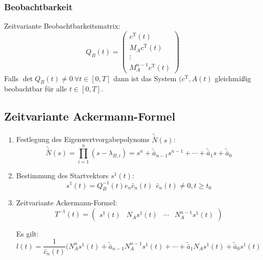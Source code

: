 \subsubsection{Beobachtbarkeit}
Zeitvariante Beobachtbarkeitsmatrix:
\begin{equation}
    Q_B(t) =
    \begin{pmatrix}
        c^\text{T}(t) \\ M_A c^\text{T}(t) \\ \vdots \\ M_A^{n-1} c^\text{T} (t)
    \end{pmatrix}
\end{equation}
Falls $\det Q_B(t) \neq 0\ \forall t \in [0, T]$ dann ist das System $(c^\text{T}, A(t)$
gleichmäßig beobachtbar für alle $t \in [0, T]$.

\subsection{Zeitvariante Ackermann-Formel}
\begin{enumerate}
    \item
        Festlegung des Eigenwertvorgabepolynoms $\tilde{\bar{N}}(s)$:
        \begin{equation}
            \tilde{\bar{N}}(s) = \prod_{i=1}^n (s-\lambda_{B,i})
                = s^n + \tilde{\bar{a}}_{n-1} s^{n-1} + \cdots + \tilde{\bar{a}}_1 s +
                    \tilde{\bar{a}}_0
        \end{equation}
    \item
        Bestimmung des Startvektors $s^1(t)$:
        \begin{equation}
            s^1(t) = Q_B^{-1} (t) e_n \bar{c}_n (t)\ \ \bar{c}_n(t) \neq 0, t \geq t_0
        \end{equation}
    \item Zeitvariante Ackermann-Formel:
        \begin{equation}
            T^{-1}(t) = \begin{pmatrix}
                s^1(t) & N_A s^1(t) & \cdots & N_A^{n-1} s^1(t)
            \end{pmatrix}
        \end{equation}
        
        Es gilt:
        \begin{equation}
            l(t) = \frac{1}{\bar{c}_n(t)} (N_A^n s^1(t) + 
                \tilde{\bar{a}}_{n-1} N_A^{n-1} s^1(t) + \cdots +
                \tilde{\bar{a}}_1 N_A s^1(t) + \tilde{\bar{a}}_0 s^1(t)
        \end{equation}
\end{enumerate}


